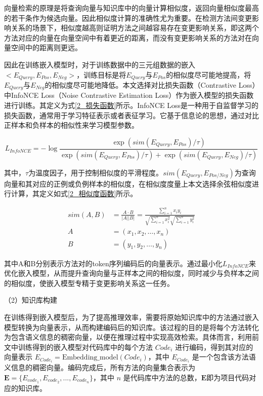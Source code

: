 向量检索的原理是将查询向量与知识库中的向量计算相似度，返回向量相似度最高的若干条作为候选向量。因此相似度计算的准确性尤为重要。在检测方法间变更影响关系的场景下，相似度越高则证明方法之间越容易存在变更影响关系，即这两个方法对应的向量在向量空间中有着更近的距离，而没有变更影响关系的方法对在向量空间中的距离则更远。

因此在训练嵌入模型时，对于训练数据中的三元组数据的嵌入$<E_{Query},E_{Pos},E_{Neg}>$，训练目标是将$E_{Query}$与$E_{Pos}$的相似度尽可能地提高，将$E_{Query}$与$E_{Neg}$的相似度尽可能地降低。本文选择对比损失函数（Contrastive Loss）中InfoNCE Loss（Noise Contrastive Estimation Loss）作为嵌入模型的损失函数进行训练。其定义为式\ref{2_损失函数}所示。InfoNCE Loss是一种用于自监督学习的损失函数，通常用于学习特征表示或者表征学习。它基于信息论的思想，通过对比正样本和负样本的相似性来学习模型参数。

\begin{equation}
    L_{InfoNCE} = -\log\frac{\exp(sim(E_{Query}, E_{Pos}) / \tau)}{\exp(sim(E_{Query}, E_{Pos}) / \tau)+\exp(sim(E_{Query}, E_{Neg}) / \tau)}
    \label{2_损失函数}
\end{equation}


其中，$\tau$为温度因子，用于控制相似度的平滑程度。$sim(E_{Query}, E_{Pos/Neg})$为查询向量和其对应的正例或负例样本的相似度，在相似度度量上本文选择余弦相似度进行计算，其定义如式\ref{2_相似度函数}所示。

\begin{align}
sim(A,B)&=\frac{A\cdot B}{\vert A\vert\vert B\vert}=\frac{\sum_{i = 1}^{n}x_iy_i}{\sqrt{\sum_{i = 1}^{n}x_i^2}\sqrt{\sum_{i = 1}^{n}y_i^2}} \\
A &= (x_1, x_2, \dots, x_n) \\
B &= (y_1, y_2, \dots, y_n)
\label{2_相似度函数}
\end{align}

其中A和B分别表示方法对的token序列编码后的向量表示。通过最小化$L_{InfoNCE}$来优化嵌入模型，从而提升查询向量与正样本之间的相似度，同时减少与负样本之间的相似度，使嵌入模型专精于变更影响关系这一任务。

（2）知识库构建

在训练得到嵌入模型后，为了提高推理效率，需要将原始知识库中的方法通过嵌入模型转换为向量表示，从而构建编码后的知识库。该过程的目的是将每个方法转化为包含语义信息的稠密向量，以便在推理过程中实现高效检索。具体而言，利用前文中训练得到的嵌入模型对代码库中的每个方法 $Code_i$ 进行编码，得到其对应的向量表示 $E_{Code_i} = \text{Embedding\_model}(Code_i)$，其中 $E_{Code_i}$ 是一个包含该方法语义信息的稠密向量。编码完成后，所有方法的向量集合表示为 $\mathbf{E} = \{ E_{code_1}, E_{code_2}, ..., E_{code_n} \}$，其中 $n$ 是代码库中方法的总数，$\mathbf{E}$即为项目代码对应的知识库。


